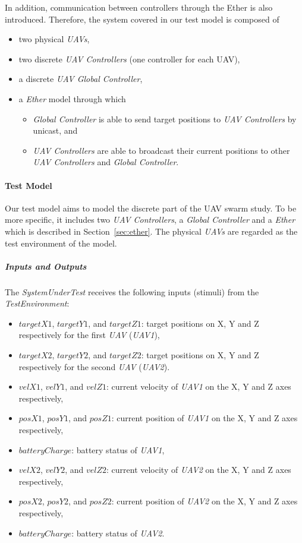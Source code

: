 In addition, communication between controllers through the Ether is also introduced.  Therefore, the system covered in our test model is composed of
\begin{itemize}
    \item two physical \emph{UAVs},
    \item two discrete \emph{UAV Controllers} (one controller for each UAV),
    \item a discrete \emph{UAV Global Controller},
    \item a \emph{Ether} model through which
        \begin{itemize}
            \item \emph{Global Controller} is able to send target positions to \emph{UAV Controllers} by unicast, and
            \item \emph{UAV Controllers} are able to broadcast their current positions to other \emph{UAV Controllers} and \emph{Global Controller}.
        \end{itemize}
\end{itemize}

\paragraph{Test Model}
Our test model aims to model the discrete part of the UAV swarm study. To be more specific, it includes two \emph{UAV Controllers}, a \emph{Global Controller} and a \emph{Ether} which is described in Section~\ref{sec:ether}. The physical \emph{UAVs} are regarded as the test environment of the model.

\subparagraph{Inputs and Outputs}
The \emph{SystemUnderTest} receives the following inputs (stimuli) from the \emph{TestEnvironment}:
\begin{itemize}
    \item $targetX1$, $targetY1$, and $targetZ1$: target positions on X, Y and Z respectively for the first \emph{UAV} (\emph{UAV1}), 
    \item $targetX2$, $targetY2$, and $targetZ2$: target positions on X, Y and Z respectively for the second \emph{UAV} (\emph{UAV2}).
%
    \item $velX1$, $velY1$, and $velZ1$: current velocity of \emph{UAV1} on the X, Y and Z axes respectively,
    \item $posX1$, $posY1$, and $posZ1$: current position of \emph{UAV1} on the X, Y and Z axes respectively, 
    \item $batteryCharge$: battery status of \emph{UAV1},
    \item $velX2$, $velY2$, and $velZ2$: current velocity of \emph{UAV2} on the X, Y and Z axes respectively,
    \item $posX2$, $posY2$, and $posZ2$: current position of \emph{UAV2} on the X, Y and Z axes respectively,
    \item $batteryCharge$: battery status of \emph{UAV2}.
\end{itemize}

